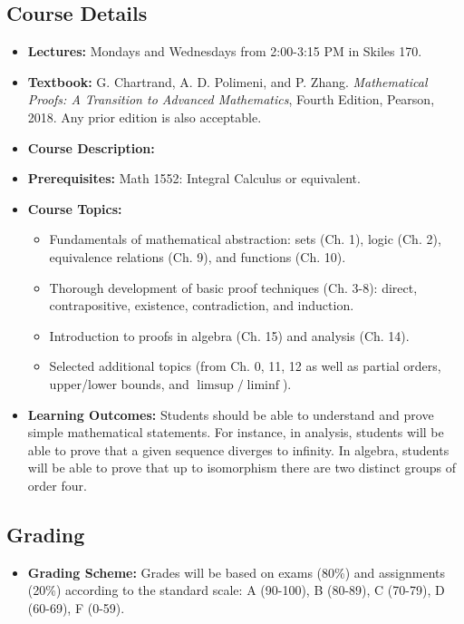\subsection*{Course Details}
\begin{itemize}[labelwidth=]
    \item \textbf{Lectures:} Mondays and Wednesdays from 2:00-3:15 PM in Skiles 170.
    \item \textbf{Textbook:} G. Chartrand, A. D. Polimeni, and P. Zhang. \textit{Mathematical Proofs: A Transition to Advanced Mathematics}, Fourth Edition, Pearson, 2018. Any prior edition is also acceptable.
    \item \textbf{Course Description:} 
    \item \textbf{Prerequisites:} Math 1552: Integral Calculus or equivalent.
    \item \textbf{Course Topics:}
    \begin{itemize}
        \item Fundamentals of mathematical abstraction: sets (Ch. 1), logic (Ch. 2), equivalence relations (Ch. 9), and functions (Ch. 10).
        \item Thorough development of basic proof techniques (Ch. 3-8): direct, contrapositive, existence, contradiction, and induction.
        \item Introduction to proofs in algebra (Ch. 15) and analysis (Ch. 14).
        \item Selected additional topics (from Ch. 0, 11, 12 as well as partial orders, upper/lower bounds, and $\limsup / \liminf$).
    \end{itemize}
    \item \textbf{Learning Outcomes:} Students should be able to understand and prove simple mathematical statements. For instance, in analysis, students will be able to prove that a given sequence diverges to infinity. In algebra, students will be able to prove that up to isomorphism there are two distinct groups of order four.
\end{itemize}

\subsection*{Grading}
\begin{itemize}[labelwidth=]
    \item \textbf{Grading Scheme:} Grades will be based on exams (80\%) and assignments (20\%) according to the standard scale: A (90-100), B (80-89), C (70-79), D (60-69), F (0-59).
\end{itemize}

